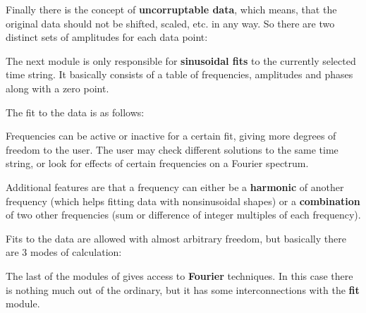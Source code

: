 Finally there is the concept of {\bf uncorruptable data},
which means, that the original data should not be shifted, scaled,
etc. in any way. So there are two distinct sets of amplitudes for each 
data point:


The next module is only responsible for {\bf sinusoidal fits} to the
currently selected time string. 
It basically consists of a table of frequencies,
amplitudes and phases along with a zero point.

The fit to the data is as follows:\\

Frequencies can be active or inactive for a certain fit,
giving more degrees of freedom to the user. The user may check different
solutions to the same time string, or look for effects of certain frequencies
on a Fourier spectrum.

Additional features are that a frequency can either be a {\bf harmonic} 
of another frequency (which helps fitting data with nonsinusoidal
shapes) or a {\bf combination} of two other frequencies 
(sum or difference of integer multiples of each frequency).

Fits to the data are allowed with almost arbitrary freedom,
but basically there are 3 modes of calculation:

The last of the modules of \period gives access to {\bf Fourier} techniques.
In this case there is nothing much out of the ordinary, but it has 
some interconnections with the {\bf fit} module. 

